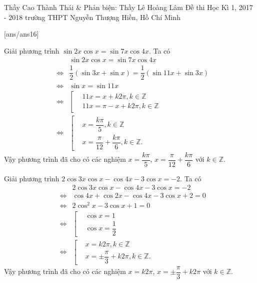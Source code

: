  \begin{name}
  {Thầy Cao Thành Thái \& Phản biện: Thầy Lê Hoàng Lâm}
  {Đề thi Học Kì 1, 2017 - 2018 trường THPT Nguyễn Thượng Hiền, Hồ Chí Minh}
 \end{name}
 
\setcounter{ex}{0}\setcounter{bt}{0}
[ans/ans16]

\begin{bt}%
 Giải phương trình $\sin 2x\cos x=\sin 7x\cos 4x$.
 \loigiai
  {
  Ta có
  \allowdisplaybreaks
  \begin{eqnarray*}
   && \sin 2x\cos x=\sin 7x\cos 4x \\
   &\Leftrightarrow & \dfrac{1}{2}\left(\sin 3x + \sin x\right) = \dfrac{1}{2}\left(\sin 11x + \sin 3x\right)\\
   &\Leftrightarrow & \sin x = \sin 11x \\
   &\Leftrightarrow & \left[\begin{aligned}&11x=x+k2\pi,k\in\mathbb{Z}	\\&11x=\pi-x+k2\pi,k\in\mathbb{Z}\end{aligned}\right.\\
   &\Leftrightarrow & \left[\begin{aligned}&x=\dfrac{k\pi}{5},k\in\mathbb{Z}	\\&x=\dfrac{\pi}{12}+\dfrac{k\pi}{6},k\in\mathbb{Z}.\end{aligned}\right.
  \end{eqnarray*}
  Vậy phương trình đã cho có các nghiệm $x=\dfrac{k\pi}{5}$, $x=\dfrac{\pi}{12}+\dfrac{k\pi}{6}$ với $k\in\mathbb{Z}$.
  }
\end{bt}

\begin{bt}%
 Giải phương trình $2\cos 3x\cos x-\cos 4x-3\cos x=-2$.
 \loigiai
  {
  Ta có
  \allowdisplaybreaks
  \begin{eqnarray*}
   && 2\cos 3x\cos x-\cos 4x-3\cos x=-2 \\
   &\Leftrightarrow & \cos 4x + \cos 2x - \cos 4x -3\cos x + 2=0 \\
   &\Leftrightarrow & 2\cos^2 x-3\cos x+1=0 \\
   &\Leftrightarrow & \left[\begin{aligned}&\cos x=1 \\&\cos x=\dfrac{1}{2}\end{aligned}\right. \\
   &\Leftrightarrow & \left[\begin{aligned}&x=k2\pi, k\in\mathbb{Z} \\&x=\pm\dfrac{\pi}{3}+k2\pi,k\in\mathbb{Z}.\end{aligned}\right.
  \end{eqnarray*}
  Vậy phương trình đã cho có các nghiệm $x=k2\pi$, $x=\pm\dfrac{\pi}{3}+k2\pi$ với $k\in\mathbb{Z}$.
  }
\end{bt}

